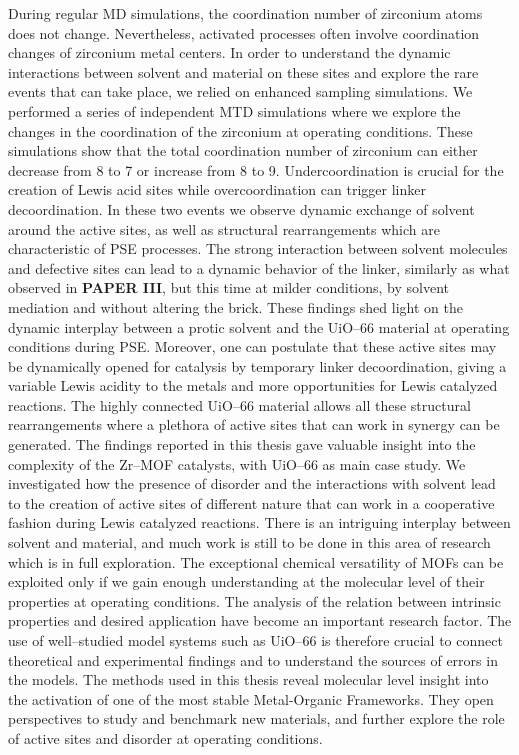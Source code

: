 \npar
During regular MD simulations, the coordination number of zirconium atoms does not change. Nevertheless, activated processes often involve coordination changes of zirconium metal centers. In order to understand the dynamic interactions between solvent and material on these sites and explore the rare events that can take place, we relied on enhanced sampling simulations. We performed a series of independent MTD simulations where we explore the changes in the coordination of the zirconium at operating conditions. These simulations show that the total coordination number of zirconium can either decrease from 8 to 7 or increase from 8 to 9. Undercoordination is crucial for the creation of Lewis acid sites while overcoordination can trigger linker decoordination. In these two events we observe dynamic exchange of solvent around the active sites, as well as structural rearrangements which are characteristic of PSE processes. The strong interaction between solvent molecules and defective sites can lead to a dynamic behavior of the linker, similarly as what observed in \textbf{PAPER III}, but this time at milder conditions, by solvent mediation and without altering the brick. These findings shed light on the dynamic interplay between a protic solvent and the UiO--66 material at operating conditions during PSE. Moreover, one can postulate that these active sites may be dynamically opened for catalysis by temporary linker decoordination, giving a variable Lewis acidity to the metals and more opportunities for Lewis catalyzed reactions. The highly connected UiO--66 material allows all these structural rearrangements where a plethora of active sites that can work in synergy can be generated.
\npar
The findings reported in this thesis gave valuable insight into the complexity of the Zr--MOF catalysts, with UiO--66 as main case study. We investigated how the presence of disorder and the interactions with solvent lead to the creation of active sites of different nature that can work in a cooperative fashion during Lewis catalyzed reactions. There is an intriguing interplay between solvent and material, and much work is still to be done in this area of research which is in full exploration. 
The exceptional chemical versatility of MOFs can be exploited only if we gain enough understanding at the molecular level of their properties at operating conditions. The analysis of the relation between intrinsic properties and desired application have become an important research factor. The use of well--studied model systems such as UiO--66 is therefore crucial to connect theoretical and experimental findings and to understand the sources of errors in the models. The methods used in this thesis reveal molecular level insight into the activation of one of the most stable Metal-Organic Frameworks. They open perspectives to study and benchmark new materials, and further explore the role of active sites and disorder at operating conditions. 
